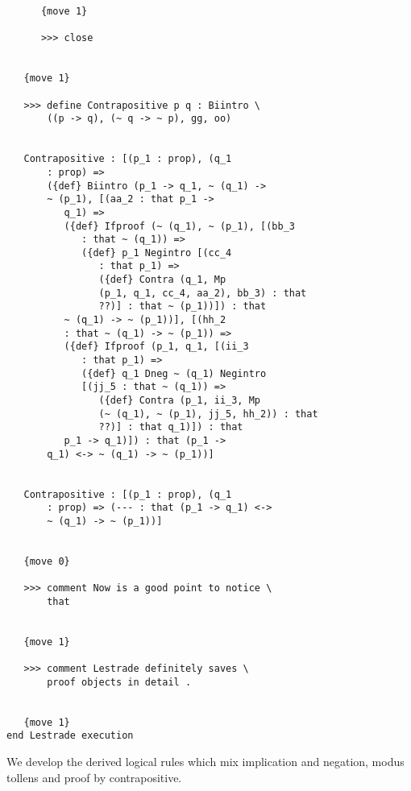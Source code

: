 \documentclass[12pt]{article}
\begin{document}
\begin{verbatim}
      {move 1}

      >>> close


   {move 1}

   >>> define Contrapositive p q : Biintro \
       ((p -> q), (~ q -> ~ p), gg, oo)


   Contrapositive : [(p_1 : prop), (q_1 
       : prop) => 
       ({def} Biintro (p_1 -> q_1, ~ (q_1) -> 
       ~ (p_1), [(aa_2 : that p_1 -> 
          q_1) => 
          ({def} Ifproof (~ (q_1), ~ (p_1), [(bb_3 
             : that ~ (q_1)) => 
             ({def} p_1 Negintro [(cc_4 
                : that p_1) => 
                ({def} Contra (q_1, Mp 
                (p_1, q_1, cc_4, aa_2), bb_3) : that 
                ??)] : that ~ (p_1))]) : that 
          ~ (q_1) -> ~ (p_1))], [(hh_2 
          : that ~ (q_1) -> ~ (p_1)) => 
          ({def} Ifproof (p_1, q_1, [(ii_3 
             : that p_1) => 
             ({def} q_1 Dneg ~ (q_1) Negintro 
             [(jj_5 : that ~ (q_1)) => 
                ({def} Contra (p_1, ii_3, Mp 
                (~ (q_1), ~ (p_1), jj_5, hh_2)) : that 
                ??)] : that q_1)]) : that 
          p_1 -> q_1)]) : that (p_1 -> 
       q_1) <-> ~ (q_1) -> ~ (p_1))]


   Contrapositive : [(p_1 : prop), (q_1 
       : prop) => (--- : that (p_1 -> q_1) <-> 
       ~ (q_1) -> ~ (p_1))]


   {move 0}

   >>> comment Now is a good point to notice \
       that


   {move 1}

   >>> comment Lestrade definitely saves \
       proof objects in detail .


   {move 1}
end Lestrade execution
\end{verbatim}

We develop the derived logical rules which mix implication and negation, modus tollens and proof by contrapositive.
\end{document}
